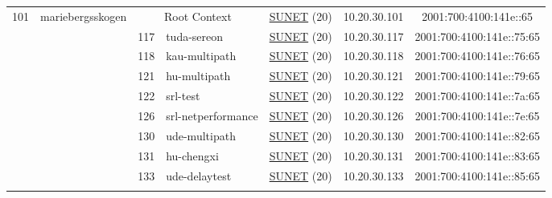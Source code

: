\begin{small}
\begin{center}
\begin{longtable}{|c|c|c|c|c|c|c|c|}
 \multirow{27}{*}{\tiny{101}} & \multicolumn{1}{|l|}{\multirow{27}{*}{\tiny{mariebergsskogen}}} & \multicolumn{2}{|c|}{\tiny{Root Context}} & \multicolumn{2}{|c|}{\tiny{\href{http://www.sunet.se}{SUNET} (20)}} & \tiny{10.20.30.101} & \tiny{2001:700:4100:141e::65} \\* \cline{3-3}\cline{4-4}\cline{5-5}\cline{6-6}\cline{7-7}\cline{8-8}
  &  & \tiny{117} & \multicolumn{1}{|l|}{\tiny{tuda-sereon}} & \multicolumn{2}{|c|}{\tiny{\href{http://www.sunet.se}{SUNET} (20)}} & \tiny{10.20.30.117} & \tiny{2001:700:4100:141e::75:65} \\* \cline{3-3}\cline{4-4}\cline{5-5}\cline{6-6}\cline{7-7}\cline{8-8}
  &  & \tiny{118} & \multicolumn{1}{|l|}{\tiny{kau-multipath}} & \multicolumn{2}{|c|}{\tiny{\href{http://www.sunet.se}{SUNET} (20)}} & \tiny{10.20.30.118} & \tiny{2001:700:4100:141e::76:65} \\* \cline{3-3}\cline{4-4}\cline{5-5}\cline{6-6}\cline{7-7}\cline{8-8}
  &  & \tiny{121} & \multicolumn{1}{|l|}{\tiny{hu-multipath}} & \multicolumn{2}{|c|}{\tiny{\href{http://www.sunet.se}{SUNET} (20)}} & \tiny{10.20.30.121} & \tiny{2001:700:4100:141e::79:65} \\* \cline{3-3}\cline{4-4}\cline{5-5}\cline{6-6}\cline{7-7}\cline{8-8}
  &  & \tiny{122} & \multicolumn{1}{|l|}{\tiny{srl-test}} & \multicolumn{2}{|c|}{\tiny{\href{http://www.sunet.se}{SUNET} (20)}} & \tiny{10.20.30.122} & \tiny{2001:700:4100:141e::7a:65} \\* \cline{3-3}\cline{4-4}\cline{5-5}\cline{6-6}\cline{7-7}\cline{8-8}
  &  & \tiny{126} & \multicolumn{1}{|l|}{\tiny{srl-netperformance}} & \multicolumn{2}{|c|}{\tiny{\href{http://www.sunet.se}{SUNET} (20)}} & \tiny{10.20.30.126} & \tiny{2001:700:4100:141e::7e:65} \\* \cline{3-3}\cline{4-4}\cline{5-5}\cline{6-6}\cline{7-7}\cline{8-8}
  &  & \tiny{130} & \multicolumn{1}{|l|}{\tiny{ude-multipath}} & \multicolumn{2}{|c|}{\tiny{\href{http://www.sunet.se}{SUNET} (20)}} & \tiny{10.20.30.130} & \tiny{2001:700:4100:141e::82:65} \\* \cline{3-3}\cline{4-4}\cline{5-5}\cline{6-6}\cline{7-7}\cline{8-8}
  &  & \tiny{131} & \multicolumn{1}{|l|}{\tiny{hu-chengxi}} & \multicolumn{2}{|c|}{\tiny{\href{http://www.sunet.se}{SUNET} (20)}} & \tiny{10.20.30.131} & \tiny{2001:700:4100:141e::83:65} \\* \cline{3-3}\cline{4-4}\cline{5-5}\cline{6-6}\cline{7-7}\cline{8-8}
  &  & \tiny{133} & \multicolumn{1}{|l|}{\tiny{ude-delaytest}} & \multicolumn{2}{|c|}{\tiny{\href{http://www.sunet.se}{SUNET} (20)}} & \tiny{10.20.30.133} & \tiny{2001:700:4100:141e::85:65} \\* \cline{3-3}\cline{4-4}\cline{5-5}\cline{6-6}\cline{7-7}\cline{8-8}

\end{longtable}
\end{center}
\end{small}
